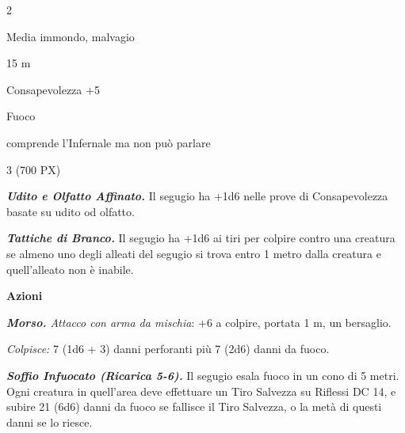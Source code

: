 \begin{multicols}{2}
{
\begin{description}[noitemsep, topsep=0pt, parsep=0pt, partopsep=0pt, itemsep=1pt, leftmargin=2.35cm,  labelwidth=2.2cm, itemindent=0cm, listparindent=0pt] %
\setlength{\baselineskip}{10pt}
\item[\textbf{Taglia/Tipo}] Media immondo, malvagio
\item[\textbf{Caratt.}] 
\item[\textbf{Punti Ferita}] 
\item[\textbf{Movimento}] 15 m
\item[\textbf{Tiri Salvez.}] 
\item[\textbf{Comp.}] Consapevolezza +5
\item[\textbf{Imm. Danni}] Fuoco
\item[\textbf{Sensi}] 
\item[\textbf{Linguaggi}] comprende l'Infernale ma non può parlare
\item[\textbf{Sfida}] 3 (700 PX)
\end{description}
\smallskip

\emph{\textbf{Udito e Olfatto Affinato.}} Il segugio ha +1d6 nelle prove di Consapevolezza basate su udito od olfatto.

\emph{\textbf{Tattiche di Branco.}} Il segugio ha +1d6 ai tiri per colpire contro una creatura se almeno uno degli alleati del segugio si trova entro 1 metro dalla creatura e quell'alleato non è inabile.

\textbf{Azioni}

\emph{\textbf{Morso.} Attacco con arma da mischia}: +6 a colpire, portata 1 m, un bersaglio.

\emph{Colpisce:} 7 (1d6 + 3) danni perforanti più 7 (2d6) danni da fuoco.

\emph{\textbf{Soffio Infuocato (Ricarica 5-6).}} Il segugio esala fuoco in un cono di 5 metri. Ogni creatura in quell'area deve effettuare un Tiro Salvezza su Riflessi DC 14, e subire 21 (6d6) danni da fuoco se fallisce il Tiro Salvezza, o la metà di questi danni se lo riesce.

}
\end{multicols}
